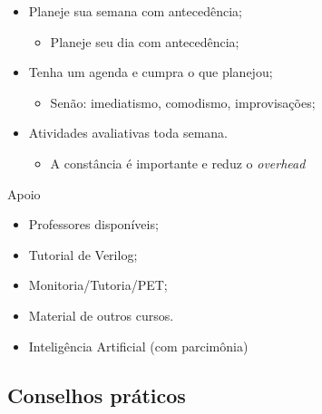 \begin{frame}{\insertsubsection} 
	\begin{itemize}
		\item Planeje sua semana com antecedência; 
		\begin{itemize}
		    \item Planeje seu dia com antecedência;
		\end{itemize}
		\item Tenha um agenda e cumpra o que planejou; 
		\begin{itemize}
		    \item Senão: imediatismo, comodismo, improvisações;
		\end{itemize}
		\item Atividades avaliativas toda semana.
		\begin{itemize}
		    \item A constância é importante e reduz o \textit{overhead}
		\end{itemize}
	\end{itemize}
\end{frame}


\begin{frame}{Apoio}
    \begin{itemize}
        \item Professores disponíveis;
        \item Tutorial de Verilog;
        \item Monitoria/Tutoria/PET;
        \item Material de outros cursos.
        \item Inteligência Artificial (com parcimônia)
    \end{itemize}
\end{frame}





\subsection{Conselhos práticos} %

